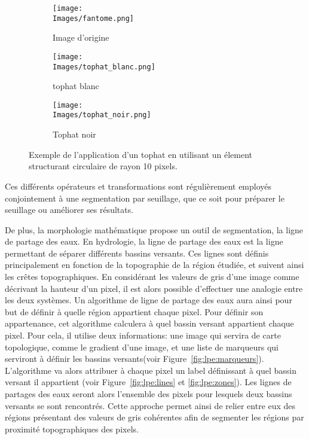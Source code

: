 \documentclass[\main/main.tex]{subfiles}
\providecommand{\Images}{\main/Figures/intro_seg}
\begin{document}
\begin{figure}[h]
    \centering
    \begin{subfigure}[b]{0.30\textwidth}
       \caption{
       Image d'origine
            }
       \centering \texttt{[image: \\Images/fantome.png]}
    \end{subfigure}
    \begin{subfigure}[b]{0.30\textwidth}
       \caption{
       \label{fig:tophat:blanc}
            tophat blanc
            }
       \centering \texttt{[image: \\Images/tophat\_blanc.png]}
    \end{subfigure}
    \begin{subfigure}[b]{0.30\textwidth}
       \caption{
           \label{fig:tophat:noir}
            Tophat noir
            }
       \centering \texttt{[image: \\Images/tophat\_noir.png]}
    \end{subfigure}
    \caption{
        Exemple de l'application d'un tophat en utilisant un élement structurant circulaire de rayon 10 pixels.
    }
    
\end{figure}
%
Ces différents opérateurs et transformations sont régulièrement employés conjointement à une segmentation par seuillage,
que ce soit pour préparer le seuillage ou améliorer ses résultats\cite{ilhan_2019,siri_2020,liu_2019}.

%
De plus, la morphologie mathématique propose un outil de segmentation, la ligne de partage des eaux\cite{meyer_1994}.
%
En hydrologie, la ligne de partage des eaux est la ligne permettant de séparer différents bassins versants.
%
Ces lignes sont définis principalement en fonction de la topographie de la région étudiée, et suivent ainsi les crêtes topographiques.
%
En considérant les valeurs de gris d'une image comme décrivant la hauteur d'un pixel,
il est alors possible d'effectuer une analogie entre les deux systèmes.
%
Un algorithme de ligne de partage des eaux aura ainsi pour but de définir à quelle région appartient chaque pixel.
%
Pour définir son appartenance,
cet algorithme calculera à quel bassin versant appartient chaque pixel.
%
Pour cela, il utilise deux informations: une image qui servira de carte topologique, comme le gradient d'une image, et une liste de marqueurs qui serviront à définir les bassins versants(voir Figure~\ref{fig:lpe:marqueurs}).
%
L'algorithme va alors attribuer à chaque pixel un label définissant à quel bassin versant il appartient (voir Figure~\ref{fig:lpe:lines} et \ref{fig:lpe:zones}).
%
Les lignes de partages des eaux seront alors l'ensemble des pixels pour lesquels deux bassins versants se sont rencontrés.
%
Cette approche permet ainsi de relier entre eux des régions présentant des valeurs de gris cohérentes afin de segmenter les régions par proximité topographiques des pixels\cite{liang_2019,eschweiler_2019}.
%
\end{document}
